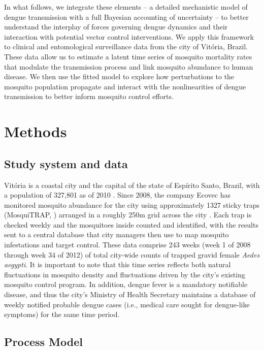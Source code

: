 \documentclass[10pt,letterpaper]{article}
\begin{document}
In what follows, we integrate these elements -- a detailed mechanistic model of dengue transmission with a full Bayesian accounting of uncertainty --  to better understand the interplay of forces governing dengue dynamics and their interaction with potential vector control interventions.
We apply this framework to clinical and entomological surveillance data from the city of Vit\'oria, Brazil.
These data allow us to estimate a latent time series of mosquito mortality rates that modulate the transmission process and link mosquito abundance to human disease.  
We then use the fitted model to explore how perturbations to the mosquito population propagate and interact with the nonlinearities of dengue transmission to better inform mosquito control efforts.

\section*{Methods}

\subsection*{Study system and data}

Vit\'oria is a coastal city and the capital of the state of Esp\'irito Santo, Brazil, with a population of 327,801 as of 2010 \cite{vitpop}.
Since 2008, the company Ecovec has monitored mosquito abundance for the city using approximately 1327 sticky traps (MosquiTRAP, \cite{Eiras2009}) arranged in a roughly 250m grid across the city \cite{Pepin2015, Lana2018}.
Each trap is checked weekly and the mosquitoes inside counted and identified, with the results sent to a central database that city managers then use to map mosquito infestations and target control.
These data comprise 243 weeks (week 1 of 2008 through week 34 of 2012) of total city-wide counts of trapped gravid female \emph{Aedes aegypti}.
It is important to note that this time series reflects both natural fluctuations in mosquito density and fluctuations driven by the city's existing mosquito control program.
In addition, dengue fever is a mandatory notifiable disease, and thus the city's Ministry of Health Secretary maintains a database of weekly notified probable dengue cases (i.e., medical care sought for dengue-like symptoms) for the same time period.

\subsection*{Process Model}
\end{document}
